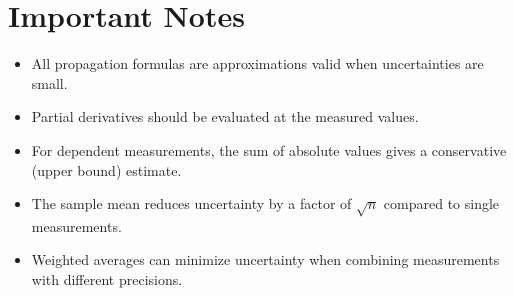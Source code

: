 \documentclass[11pt]{article}
\begin{document}
\section*{Important Notes}
\begin{itemize}[nosep]
    \item All propagation formulas are approximations valid when uncertainties are small.
    \item Partial derivatives should be evaluated at the measured values.
    \item For dependent measurements, the sum of absolute values gives a conservative (upper bound) estimate.
    \item The sample mean reduces uncertainty by a factor of \(\sqrt{n}\) compared to single measurements.
    \item Weighted averages can minimize uncertainty when combining measurements with different precisions.
\end{itemize}
\end{document}
